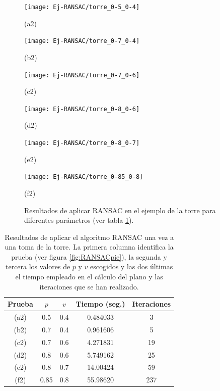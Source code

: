 \begin{figure}[h!]
	\begin{minipage}[b]{0.5\textwidth}
		\centering
		\texttt{[image: Ej-RANSAC/torre\_0-5\_0-4]} 
		\caption*{(a2)}
	\end{minipage}
	\begin{minipage}[b]{0.5\textwidth}
		\centering
		\texttt{[image: Ej-RANSAC/torre\_0-7\_0-4]} 
		\caption*{(b2)}
	\end{minipage}
	\begin{minipage}[b]{0.5\textwidth}
		\centering
		\texttt{[image: Ej-RANSAC/torre\_0-7\_0-6]} 
		\caption*{(c2)}
	\end{minipage}
	\begin{minipage}[b]{0.5\textwidth}
		\centering
		\texttt{[image: Ej-RANSAC/torre\_0-8\_0-6]} 
		\caption*{(d2)}
	\end{minipage}		
	\begin{minipage}[b]{0.5\textwidth}
		\centering
		\texttt{[image: Ej-RANSAC/torre\_0-8\_0-7]} 
		\caption*{(e2)}
	\end{minipage}
	\begin{minipage}[b]{0.5\textwidth}
		\centering
		\texttt{[image: Ej-RANSAC/torre\_0-85\_0-8]} 
		\caption*{(f2)}
	\end{minipage}	
	
	\caption{Resultados de aplicar RANSAC en el ejemplo de la torre para diferentes parámetros (ver tabla \ref{table:RANSACtorreTable}). }
	\label{fig:RANSACtorre}
\end{figure}

\begin{table}[h!]
	\centering
	\begin{tabular}{| c | c | c || c | c |} 
		\hline
		Prueba & $ p $ & $ v $ & Tiempo (seg.) & Iteraciones \\
		\hline
		(a2) & 0.5 & 0.4 & 0.484033 & 3 \\		
		(b2) & 0.7 & 0.4 & 0.961606 & 5  \\	
		(c2) & 0.7 & 0.6 & 4.271831 &  19 \\
		(d2) & 0.8 & 0.6 & 5.749162 & 25\\
		(e2) & 0.8 & 0.7 & 14.00424 & 59 \\
		(f2) & 0.85 & 0.8 & 55.98620 & 237\\
		\hline
	\end{tabular}
	\caption{Resultados de aplicar el algoritmo RANSAC una vez a una toma de  la torre. La primera columna identifica la prueba (ver figura \ref{fig:RANSACpie}), la segunda y tercera los valores de $ p $ y $ v $ escogidos y las dos últimas el tiempo empleado en el cálculo del plano y las iteraciones que se han realizado.}
	\label{table:RANSACtorreTable}
\end{table}

